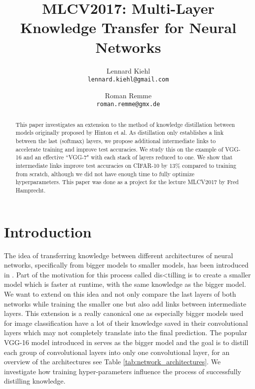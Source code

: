 \documentclass[10pt,twocolumn,letterpaper]{article}
\begin{document}
\title{MLCV2017: Multi-Layer Knowledge Transfer for Neural Networks}

\author{Lennard Kiehl\\
{\tt\small lennard.kiehl@gmail.com}
\and
Roman Remme\\
{\tt\small roman.remme@gmx.de}
}

\maketitle

\begin{abstract}
	This paper investigates an extension to the method of knowledge distillation between models originally proposed by Hinton et al. As distillation only establishes a link between the last (softmax) layers, we propose additional intermediate links to accelerate training and improve test accuracies. We study this on the example of VGG-16 and an effective ``VGG-7" with each stack of layers reduced to one. We show that intermediate links improve test accuracies on CIFAR-10 by 13\% compared to training from scratch, although we did not have enough time to fully optimize hyperparameters. This paper was done as a project for the lecture MLCV2017 by Fred Hamprecht. 
\end{abstract}

\section{Introduction}

The idea of transferring knowledge between different architectures of neural networks, specifically from bigger models to smaller models, has been introduced in \cite{hinton2015distilling}. Part of the motivation for this process called dis<tilling is to create a smaller model which is faster at runtime, with the same knowledge as the bigger model. We want to extend on this idea and not only compare the last layers of both networks while training the smaller one but also add links between intermediate layers. This extension is a really canonical one as especially bigger models used for image classification have a lot of their knowledge saved in their convolutional layers which may not completely translate into the final prediction. The popular VGG-16 model introduced in \cite{DBLP:journals/corr/SimonyanZ14a} serves as the bigger model and the goal is to distill each group of convolutional layers into only one convolutional layer, for an overview of the architectures see Table \ref{tab:network_architectures}. We investigate how training hyper-parameters influence the process of successfully distilling knowledge.
\end{document}
